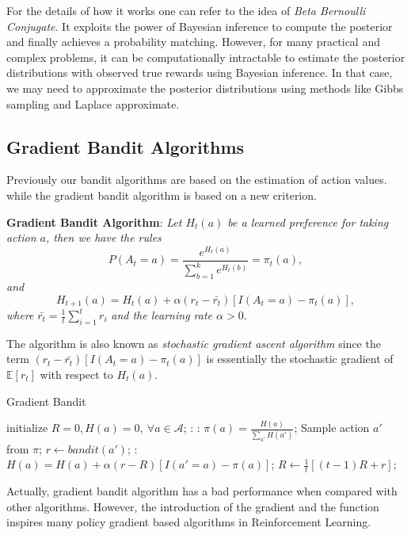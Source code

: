 \documentclass{progartcn}
\begin{document}
    	For the details of how it works one can refer to the idea of \textit{Beta Bernoulli Conjugate}. It exploits the power of Bayesian inference to compute the posterior and finally achieves a probability matching. However, for many practical and complex problems, it can be computationally intractable to estimate the posterior distributions with observed true rewards using Bayesian inference. In that case, we may need to approximate the posterior distributions using methods like Gibbs sampling and Laplace approximate.\\

    \subsection{Gradient Bandit Algorithms}

    	Previously our bandit algorithms are based on the estimation of action values. while the gradient bandit algorithm is based on a new criterion.

    	\textbf{Gradient Bandit Algorithm}: \textit{Let $H_t(a)$ be a learned preference for taking action $a$, then we have the rules}
    	\[P(A_t=a)=\frac{e^{H_t(a)}}{\sum_{b=1}^k e^{H_t(b)}}=\pi_t(a),\]
    	\textit{and}
    	\[H_{t+1}(a)=H_t(a)+\alpha(r_t-\bar{r_t})[I(A_t=a)-\pi_t(a)],\]
    	\textit{where }$\bar{r_t}=\frac{1}{t}\sum_{i=1}^t r_i$ \textit{ and the learning rate $\alpha>0$}.

    	The algorithm is also known as \textit{stochastic gradient ascent algorithm} since the term $(r_t-\bar{r_t})[I(A_t=a)-\pi_t(a)]$ is essentially the stochastic gradient of $\mathbb{E}[r_t]$ with respect to $H_t(a)$.

    	\begin{algorithm}[H]
		\caption{Gradient Bandit}
		\label{alg: gb}
		\begin{algorithmic}[1]
			\State initialize $R=0, H(a)=0,\ \forall a\in\mathcal{A}$;
			:
			:
				\State $\pi(a) = \frac{H(a)}{\sum_{a'} H(a')}$;
			\EndFor
			\State Sample action $a'$ from $\pi$;
			\State $r\gets bandit(a')$;
			:
				\State $H(a) = H(a) + \alpha(r-R)[I(a'=a)-\pi(a)]$;
				\State $R\gets \frac{1}{t}[(t-1)R+r]$;
        	\EndFor
        	\EndFor
		\end{algorithmic}
		\end{algorithm}

    	Actually, gradient bandit algorithm has a bad performance when compared with other algorithms. However, the introduction of the gradient and the function inspires many policy gradient based algorithms in Reinforcement Learning.
\end{document}
